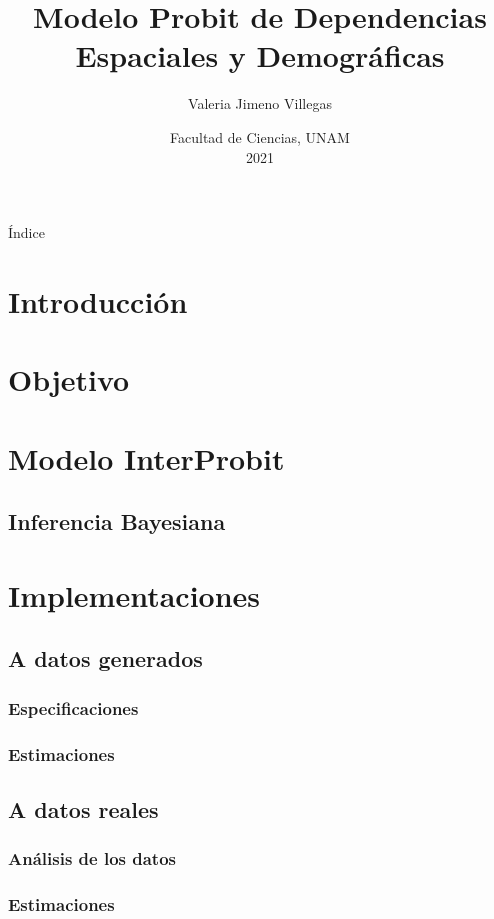 \documentclass{beamer}
\title[Modelo InterProbit]{Modelo Probit de Dependencias Espaciales y Demográficas}
\date{Facultad de Ciencias, UNAM\\
2021}
\author[VJV]{Valeria Jimeno Villegas}
\institute[UNAM]{Asesora: Dra. Ruth Selene Fuentes García}
\begin{document}
\maketitle
\begin{frame}{Índice}
\tableofcontents
\end{frame}

\section{Introducción}
% 
\section{Objetivo}

\section{Modelo InterProbit}

\subsection{Inferencia Bayesiana}



\section{Implementaciones}
\subsection{A datos generados}
\subsubsection{Especificaciones}
\subsubsection{Estimaciones}
\subsection{A datos reales}
\subsubsection{Análisis de los datos}
\subsubsection{Estimaciones}
\end{document}
